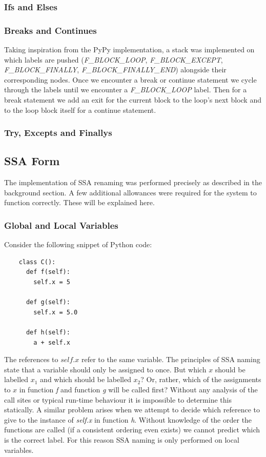 \documentclass[12pt, titlepage]{article}
\begin{document}
\subsubsection{Ifs and Elses}


\subsubsection{Breaks and Continues} 
Taking inspiration from the PyPy implementation, a stack was implemented on which labels are pushed (\textit{F\_BLOCK\_LOOP}, \textit{F\_BLOCK\_EXCEPT}, \textit{F\_BLOCK\_FINALLY}, \textit{F\_BLOCK\_FINALLY\_END}) alongside their corresponding nodes. Once we encounter a break or continue statement we cycle through the labels until we encounter a \textit{F\_BLOCK\_LOOP} label. Then for a break statement we add an exit for the current block to the loop's next block and to the loop block itself for a continue statement.

\subsubsection{Try, Excepts and Finallys} 

\subsection{SSA Form}
The implementation of SSA renaming was performed precisely as described in the background section. A few additional allowances were required for the system to function correctly. These will be explained here.

\subsubsection{Global and Local Variables}
Consider the following snippet of Python code:
\begin{lstlisting}
    class C():
      def f(self):
        self.x = 5
     
      def g(self):
        self.x = 5.0         
        
      def h(self):
        a + self.x 
\end{lstlisting}
The references to $self.x$ refer to the same variable. The principles of SSA naming state that a variable should only be assigned to once. But which $x$ should be labelled $x_1$ and which should be labelled $x_2$? Or, rather, which of the assignments to $x$ in function \textit{f} and function \textit{g} will be called first? Without any analysis of the call sites or typical run-time behaviour it is impossible to determine this statically. A similar problem arises when we attempt to decide which reference to give to the instance of \textit{self.x} in function \textit{h}. Without knowledge of the order the functions are called (if a consistent ordering even exists) we cannot predict which is the correct label. For this reason SSA naming is only performed on local variables.
\end{document}
